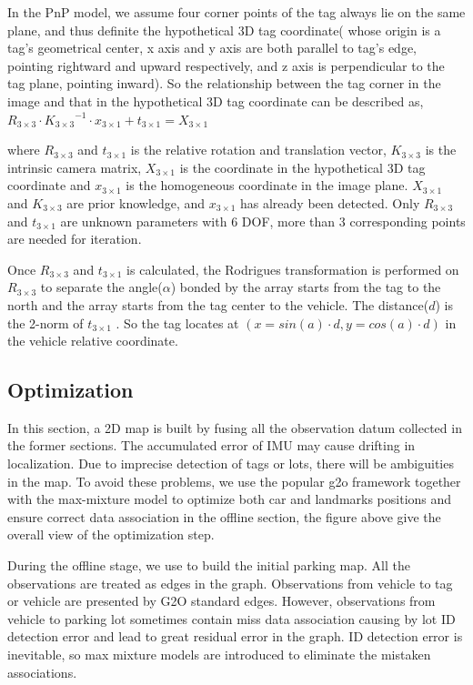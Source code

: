 \documentclass[journal]{IEEEtran}
\begin{document}
In the PnP model, we assume four corner points of the tag always lie on the same plane, and thus definite the hypothetical 3D tag coordinate( whose origin is a tag’s geometrical center, x axis and y axis are both parallel to tag’s edge, pointing rightward and upward respectively, and z axis is perpendicular to the tag plane, pointing inward). 
So the relationship between the tag corner in the image and that in the hypothetical 3D tag coordinate can be described as,
${R}_{3 \times 3} \cdot {{K}_{3 \times 3}}^{-1} \cdot {x}_{3 \times 1}+{t}_{3 \times 1}={X}_{3 \times 1}$

where ${R}_{3 \times 3}$ and ${t}_{3 \times 1}$ is the relative rotation and translation vector, 
${K}_{3 \times 3}$ is the intrinsic camera matrix, 
${X}_{3 \times 1}$ is the coordinate in the hypothetical 3D tag coordinate and ${x}_{3 \times 1}$ is the homogeneous coordinate in the image plane. 
${X}_{3 \times 1}$ and ${K}_{3 \times 3}$ are prior knowledge, 
and ${x}_{3 \times 1}$ has already been detected. 
Only ${R}_{3 \times 3}$ and ${t}_{3 \times 1}$ are unknown parameters with 6 DOF, more than 3 corresponding points are needed for iteration. 

Once ${R}_{3 \times 3}$ and ${t}_{3 \times 1}$ is calculated, the Rodrigues transformation is performed on ${R}_{3 \times 3}$ to separate the angle($\alpha$) bonded by the array starts from the tag to the north and the array starts from the tag center to the vehicle. 
The distance($d$) is the 2-norm of ${t}_{3 \times 1}$ . 
So the tag locates at $( x=sin(a) \cdot d, y=cos(a) \cdot d)$ in the vehicle relative coordinate.

\subsection{Optimization}

In this section, a 2D map is built by fusing all the observation datum collected in the former sections. 
The accumulated error of IMU may cause drifting in localization. 
Due to imprecise detection of tags or lots, there will be ambiguities in the map. 
To avoid these problems, we use the popular g2o\cite{K2011G2o} framework together with the max-mixture model \cite{Pfingsthorn2014Representing} to optimize both car and landmarks positions and ensure correct data association in the offline section, the figure above give the overall view of the optimization step.

During the offline stage, we use \cite{K2011G2o} to build the initial parking map. 
All the observations are treated as edges in the graph. 
Observations from vehicle to tag or vehicle are presented by G2O standard edges. 
However, observations from vehicle to parking lot sometimes contain miss data association causing by lot ID detection error and lead to great residual error in the graph. 
ID detection error is inevitable, so max mixture models \cite{Pfingsthorn2014Representing} are introduced to eliminate the mistaken associations.
\end{document}
